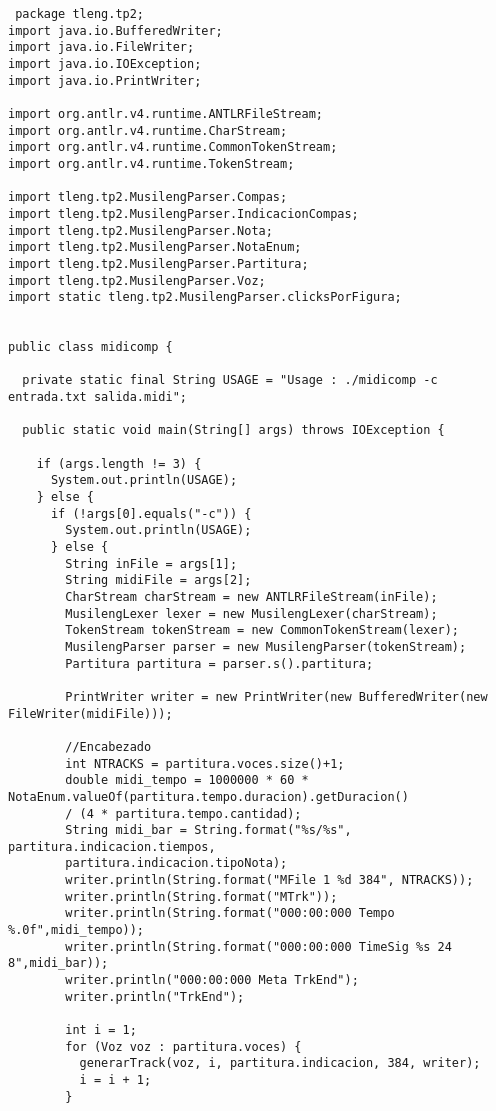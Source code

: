 \begin{verbatim}
 package tleng.tp2;
import java.io.BufferedWriter;
import java.io.FileWriter;
import java.io.IOException;
import java.io.PrintWriter;

import org.antlr.v4.runtime.ANTLRFileStream;
import org.antlr.v4.runtime.CharStream;
import org.antlr.v4.runtime.CommonTokenStream;
import org.antlr.v4.runtime.TokenStream;

import tleng.tp2.MusilengParser.Compas;
import tleng.tp2.MusilengParser.IndicacionCompas;
import tleng.tp2.MusilengParser.Nota;
import tleng.tp2.MusilengParser.NotaEnum;
import tleng.tp2.MusilengParser.Partitura;
import tleng.tp2.MusilengParser.Voz;
import static tleng.tp2.MusilengParser.clicksPorFigura;


public class midicomp {

  private static final String USAGE = "Usage : ./midicomp -c entrada.txt salida.midi";

  public static void main(String[] args) throws IOException {

    if (args.length != 3) {
      System.out.println(USAGE);
    } else {
      if (!args[0].equals("-c")) {
        System.out.println(USAGE);
      } else {
        String inFile = args[1];
        String midiFile = args[2];
        CharStream charStream = new ANTLRFileStream(inFile);
        MusilengLexer lexer = new MusilengLexer(charStream);
        TokenStream tokenStream = new CommonTokenStream(lexer);
        MusilengParser parser = new MusilengParser(tokenStream);
        Partitura partitura = parser.s().partitura;
        
        PrintWriter writer = new PrintWriter(new BufferedWriter(new FileWriter(midiFile)));
        
        //Encabezado
        int NTRACKS = partitura.voces.size()+1;
        double midi_tempo = 1000000 * 60 * NotaEnum.valueOf(partitura.tempo.duracion).getDuracion()
        / (4 * partitura.tempo.cantidad);
        String midi_bar = String.format("%s/%s", partitura.indicacion.tiempos,
        partitura.indicacion.tipoNota);
        writer.println(String.format("MFile 1 %d 384", NTRACKS));
        writer.println(String.format("MTrk"));
        writer.println(String.format("000:00:000 Tempo %.0f",midi_tempo));
        writer.println(String.format("000:00:000 TimeSig %s 24 8",midi_bar));
        writer.println("000:00:000 Meta TrkEnd");
        writer.println("TrkEnd");
        
        int i = 1;
        for (Voz voz : partitura.voces) {
          generarTrack(voz, i, partitura.indicacion, 384, writer);
          i = i + 1;
        }


\end{verbatim}
